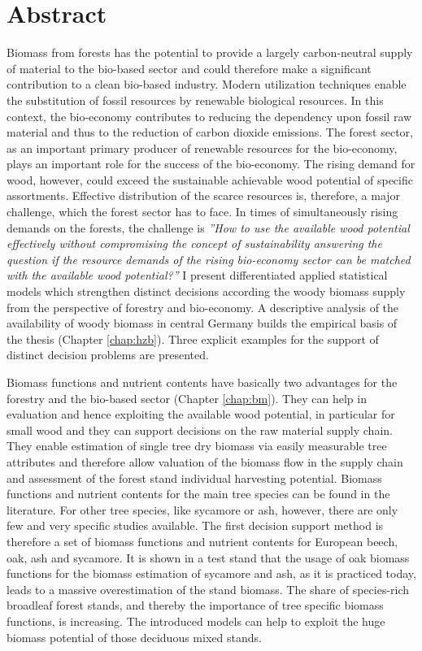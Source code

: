 \chapter*{Abstract}
\label{chap:Summary}
Biomass from forests has the potential to provide a largely carbon-neutral supply of material to the bio-based sector and could therefore make a significant contribution to a clean bio-based industry. Modern utilization techniques enable the substitution of fossil resources by renewable biological resources. In this context, the bio-economy contributes to reducing the dependency upon fossil raw material and thus to the reduction of carbon dioxide emissions. The forest sector, as an important primary producer of renewable resources for the bio-economy, plays an important role for the success of the bio-economy. The rising demand for wood, however, could exceed the sustainable achievable wood potential of specific assortments. Effective distribution of the scarce resources is, therefore, a major challenge, which the forest sector has to face. In times of simultaneously rising demands on the forests, the challenge is \textit{''How to use the available wood potential effectively without compromising the concept of sustainability answering the question if the resource demands of the rising bio-economy sector can be matched with the available wood potential?''} I present differentiated applied statistical models which strengthen distinct decisions according the woody biomass supply from the perspective of forestry and bio-economy. A descriptive analysis of the availability of woody biomass in central Germany builds the empirical basis of the thesis (Chapter \ref{chap:hzb}). Three explicit examples for the support of distinct decision problems are presented.

Biomass functions and nutrient contents have basically two advantages for the forestry and the bio-based sector (Chapter \ref{chap:bm}). They can help in evaluation and hence exploiting the available wood potential, in particular for small wood and they can support decisions on the raw material supply chain. They enable estimation of single tree dry biomass via easily measurable tree attributes and therefore allow valuation of the biomass flow in the supply chain and assessment of the forest stand individual harvesting potential. Biomass functions and nutrient contents for the main tree species can be found in the literature. For other tree species, like sycamore or ash, however, there are only few and very specific studies available. The first decision support method is therefore a set of biomass functions and nutrient contents for European beech, oak, ash and sycamore. It is shown in a test stand that the usage of oak biomass functions for the biomass estimation of sycamore and ash, as it is practiced today, leads to a massive overestimation of the stand biomass. The share of species-rich broadleaf forest stands, and thereby the importance of tree specific biomass functions, is increasing. The introduced models can help to exploit the huge biomass potential of those deciduous mixed stands.

